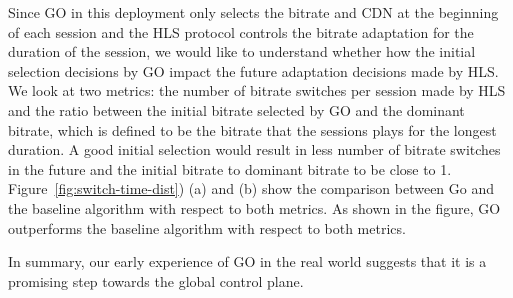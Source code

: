 Since GO in this deployment only selects the bitrate and CDN at the beginning of each session and the HLS protocol controls the bitrate adaptation for the duration of the session, we would like to understand whether how the initial selection decisions by GO impact the future adaptation decisions made by HLS. 
We look at two metrics: the number of bitrate switches per session made by HLS and the ratio between the initial bitrate selected by GO and the dominant bitrate, which is defined to be the bitrate that the sessions plays for the longest duration. A good initial selection would result in less number of bitrate switches in the future and the initial bitrate to dominant bitrate to be close to 1. 
Figure~\ref{fig:switch-time-dist}) (a) and (b) show the comparison between Go and the baseline algorithm with respect to both metrics.  As shown in the figure, GO outperforms the baseline algorithm with respect to both metrics. 



\begin{figure}[h!]
\centering
{}
\hspace{-0.6cm}
\label{fig:bitrate-stability}
\end{figure}






In summary, our early experience of GO in the real world suggests that it is a promising step towards the global control plane.

